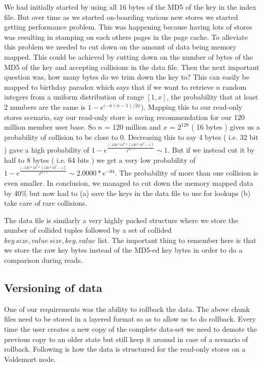 \documentclass[10pt,twocolumn,preprint,natbib,authoryear]{sigplanconf}
\begin{document}
We had initially started by using all 16 bytes of the MD5 of the key in the index file. But over time as we started on-boarding various new stores we started getting performance problem. This was happening because having lots of stores was resulting in stamping on each others pages in the page cache. To alleviate this problem we needed to cut down on the amount of data being memory mapped. This could be achieved by cutting down on the number of bytes of the MD5 of the key and accepting collisions in the data file. Then the next important question was, how many bytes do we trim down the key to? This can easily be mapped to birthday paradox which says that if we want to retrieve $n$ random integers from a uniform distribution of range $[1, x]$, the probability that at least 2 numbers are the same is  $1 - e^{(-n(n-1)/2x})$. Mapping this to our read-only stores scenario, say our read-only store is saving recommendation for our 120 million member user base. So $n$ = 120 million and $x$ = $2^{128}$ ( 16 bytes ) gives us a probability of collision to be close to 0. Decreasing this to say 4 bytes ( i.e. 32 bit ) gave a high probability of $1 - e^{\frac{(-120*10^{6} * ( 120*10^{6} - 1)}{2^{32+1}}} \sim 1$. But if we instead cut it by half to 8 bytes ( i.e. 64 bits ) we get a very low probability of $1 - e^{\frac{(-120*10^{6} * (120*10^{6} - 1)} { 2^{64+1}}} \sim 2.0000 * e^{-04}$. The probability of more than one collision is even smaller. In conclusion, we managed to cut down the memory mapped data by 40\% but now had to (a) save the keys in the data file to use for lookups (b) take care of rare collisions.

The data file is similarly a very highly packed structure where we store the number of collided tuples followed by a set of collided $key\,size, value\,size, key, value$ list. The important thing to remember here is that we store the raw key bytes instead of the MD5-ed key bytes in order to do a comparison during reads. 

\subsection{Versioning of data}

One of our requirements was the ability to rollback the data. The above chunk files need to be stored in a layered format so as to allow us to do rollback. Every time the user creates a new copy of the complete data-set we need to demote the previous copy to an older state but still keep it around in case of a scenario of rollback. Following is how the data is structured for the read-only stores on a Voldemort node. 
\end{document}
